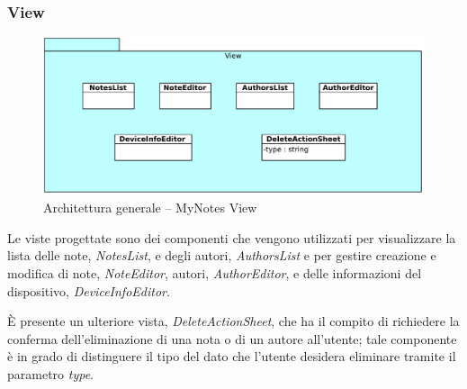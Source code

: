 \subsubsection{View}
\begin{figure}[htb]
\centering
\includegraphics[scale=0.6]{gfx/class/MyNotes_View.pdf}
\caption{Architettura generale -- MyNotes View}
\label{fig:architettura MyNotes View}
\end{figure}
Le viste progettate sono dei componenti che vengono utilizzati per visualizzare la lista delle note, \emph{NotesList}, e degli autori, \emph{AuthorsList} e per gestire creazione e modifica di note, \emph{NoteEditor}, autori, \emph{AuthorEditor}, e delle informazioni del dispositivo, \emph{DeviceInfoEditor}.

È presente un ulteriore vista, \emph{DeleteActionSheet}, che ha il compito di richiedere la conferma dell'eliminazione di una nota o di un autore all'utente; tale componente è in grado di distinguere il tipo del dato che l'utente desidera eliminare tramite il parametro \emph{type}.

